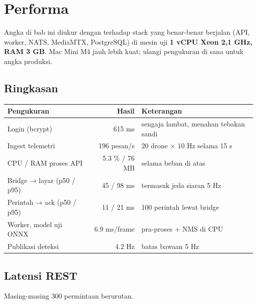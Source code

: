 \chapter{Performa}\label{bab:performa}
Angka di bab ini diukur dengan  terhadap stack yang benar-benar berjalan (API, worker, NATS, MediaMTX, PostgreSQL) di mesin uji \textbf{1 vCPU Xeon 2,1 GHz, RAM 3 GB}. Mac Mini M4 jauh lebih kuat; ulangi pengukuran di sana untuk angka produksi.

\section{Ringkasan}
\begin{center}
\begin{tabular}{@{}l r l@{}}
\toprule
Pengukuran & Hasil & Keterangan \\ \midrule
Login (bcrypt) & 615 ms & sengaja lambat, menahan tebakan sandi \\
Ingest telemetri & 196 pesan/s & 20 drone × 10 Hz selama 15 s \\
CPU / RAM proses API & 5.3 \% / 76 MB & selama beban di atas \\
Bridge → layar (p50 / p95) & 45 / 98 ms & termasuk jeda siaran 5 Hz \\
Perintah → ack (p50 / p95) & 11 / 21 ms & 100 perintah lewat bridge \\
Worker, model uji ONNX & 6.9 ms/frame & pra-proses + NMS di CPU \\
Publikasi deteksi & 4.2 Hz & batas bawaan 5 Hz \\
\bottomrule
\end{tabular}
\end{center}

\section{Latensi REST}
\begin{center}
\end{center}
Masing-masing 300 permintaan berurutan.

